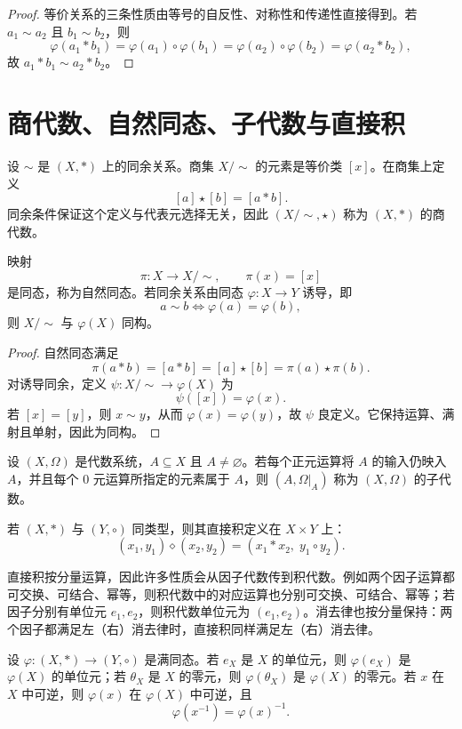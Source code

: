 \begin{proof}
  等价关系的三条性质由等号的自反性、对称性和传递性直接得到。若 $a_1\sim a_2$ 且 $b_1\sim b_2$，则
  \[
  \varphi(a_1*b_1)=\varphi(a_1)\circ\varphi(b_1)
  =\varphi(a_2)\circ\varphi(b_2)
  =\varphi(a_2*b_2),
  \]
  故 $a_1*b_1\sim a_2*b_2$。
\end{proof}

\section{商代数、自然同态、子代数与直接积}

设 $\sim$ 是 $(X,*)$ 上的同余关系。商集 $X/{\sim}$ 的元素是等价类 $[x]$。在商集上定义
\[
[a]\star[b]=[a*b].
\]
同余条件保证这个定义与代表元选择无关，因此 $(X/{\sim},\star)$ 称为 $(X,*)$ 的商代数。

\begin{theorem}[自然同态与同态分解]\label{quotient-hom}
  映射
  \[
  \pi:X\to X/{\sim},\qquad \pi(x)=[x]
  \]
  是同态，称为自然同态。若同余关系由同态 $\varphi:X\to Y$ 诱导，即
  \[
  a\sim b\Longleftrightarrow \varphi(a)=\varphi(b),
  \]
  则 $X/{\sim}$ 与 $\varphi(X)$ 同构。
\end{theorem}

\begin{proof}
  自然同态满足
  \[
  \pi(a*b)=[a*b]=[a]\star[b]=\pi(a)\star\pi(b).
  \]
  对诱导同余，定义 $\psi:X/{\sim}\to\varphi(X)$ 为
  \[
  \psi([x])=\varphi(x).
  \]
  若 $[x]=[y]$，则 $x\sim y$，从而 $\varphi(x)=\varphi(y)$，故 $\psi$ 良定义。它保持运算、满射且单射，因此为同构。
\end{proof}

\begin{definition}[子代数与直接积]\label{subalgebra-product}
  设 $(X,\Omega)$ 是代数系统，$A\subseteq X$ 且 $A\ne\varnothing$。若每个正元运算将 $A$ 的输入仍映入 $A$，并且每个 $0$ 元运算所指定的元素属于 $A$，则 $(A,\Omega|_A)$ 称为 $(X,\Omega)$ 的子代数。

  若 $(X,*)$ 与 $(Y,\circ)$ 同类型，则其直接积定义在 $X\times Y$ 上：
  \[
  (x_1,y_1)\diamond(x_2,y_2)=(x_1*x_2,\;y_1\circ y_2).
  \]
\end{definition}

直接积按分量运算，因此许多性质会从因子代数传到积代数。例如两个因子运算都可交换、可结合、幂等，则积代数中的对应运算也分别可交换、可结合、幂等；若因子分别有单位元 $e_1,e_2$，则积代数单位元为 $(e_1,e_2)$。消去律也按分量保持：两个因子都满足左（右）消去律时，直接积同样满足左（右）消去律。

\begin{theorem}[同态对特异元素的保持]\label{hom-special-elements}
  设 $\varphi:(X,*)\to(Y,\circ)$ 是满同态。若 $e_X$ 是 $X$ 的单位元，则 $\varphi(e_X)$ 是 $\varphi(X)$ 的单位元；若 $\theta_X$ 是 $X$ 的零元，则 $\varphi(\theta_X)$ 是 $\varphi(X)$ 的零元。若 $x$ 在 $X$ 中可逆，则 $\varphi(x)$ 在 $\varphi(X)$ 中可逆，且
  \[
  \varphi(x^{-1})=\varphi(x)^{-1}.
  \]
\end{theorem}

